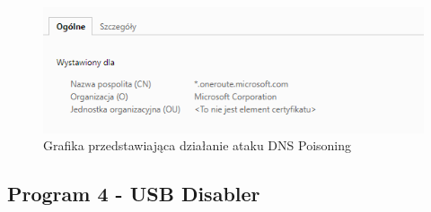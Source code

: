 \documentclass{article}
\begin{document}
\begin{itemize}
        \begin{figure}[h]
    \centering
    \includegraphics[scale=0.5]{Media/DNS.png}
    \caption{Grafika przedstawiająca działanie ataku DNS Poisoning}
    \label{fig:enter-label}
    \end{figure}
    \end{itemize}    
\subsection{Program 4 - USB Disabler}
\end{document}
